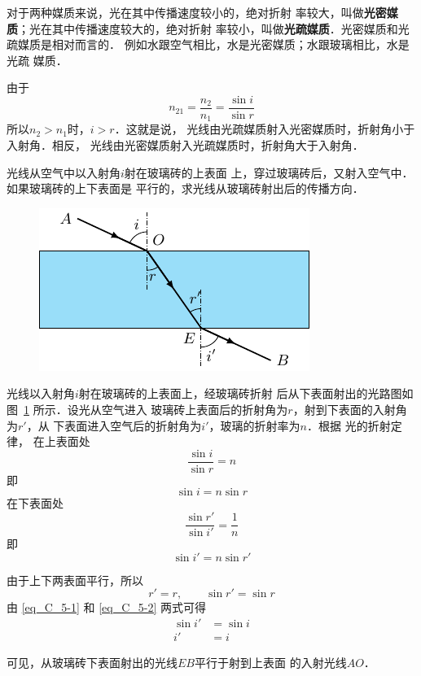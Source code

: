 对于两种媒质来说，光在其中传播速度较小的，绝对折射
率较大，叫做\textbf{光密媒质}；光在其中传播速度较大的，绝对折射
率较小，叫做\textbf{光疏媒质}．光密媒质和光疏媒质是相对而言的．
例如水跟空气相比，水是光密媒质；水跟玻璃相比，水是光疏
媒质．

由于
\[n_{21}=\frac{n_2}{n_1}=\frac{\sin i}{\sin r} \]
所以$n_2>n_1$时，$i>r$．这就是说，
光线由光疏媒质射入光密媒质时，折射角小于入射角．相反，
光线由光密媒质射入光疏媒质时，折射角大于入射角．

\begin{example}
    光线从空气中以入射角$i$射在玻璃砖的上表面
    上，穿过玻璃砖后，又射入空气中．如果玻璃砖的上下表面是
    平行的，求光线从玻璃砖射出后的传播方向．
\end{example}

\begin{figure}[htbp]
    \centering
    \includegraphics{fig/C/5-21.pdf}
    \caption{}\label{fig_C_5-21}
\end{figure}


\begin{solution}
    光线以入射角$i$射在玻璃砖的上表面上，经玻璃砖折射
后从下表面射出的光路图如图~\ref{fig_C_5-21} 所示．设光从空气进入
玻璃砖上表面后的折射角为$r$，射到下表面的入射角为$r'$，从
下表面进入空气后的折射角为$i'$，玻璃的折射率为$n$．根据
光的折射定律，
在上表面处
\[\frac{\sin i}{\sin r}=n \]
即
\begin{equation}\label{eq_C_5-1}
    \sin i=n\sin r 
\end{equation}
在下表面处
\[\frac{\sin r'}{\sin i'}=\frac{1}{n} \]
即
\begin{equation}\label{eq_C_5-2}
    \sin i' =n \sin r'
\end{equation}

由于上下两表面平行，所以
\[r'=r,\qquad \sin r'=\sin r \]
由 \eqref{eq_C_5-1} 和 \eqref{eq_C_5-2} 两式可得
\[\begin{split}
    \sin i'&=\sin i\\
i'&=i    
\end{split}\]

可见，从玻璃砖下表面射出的光线$EB$平行于射到上表面
的入射光线$AO$．
\end{solution}


